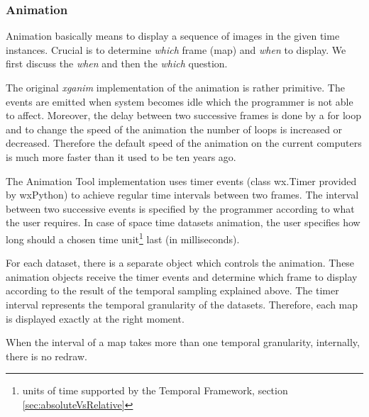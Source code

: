 \documentclass[a4paper,12pt]{book}
\newcommand{\mod}[1]{\textsl{#1}}
\newcommand{\tf}{Temporal Framework\xspace}
\newcommand{\at}{Animation Tool\xspace}
\begin{document}
\begin{table}
\end{table}

\subsubsection{Animation}
Animation basically means to display a sequence of images in the given time instances.
Crucial is to determine \emph{which} frame (map) and \emph{when} to display.
We first discuss the \emph{when}  and then the \emph{which} question.


The original \mod{xganim} implementation of the animation is rather primitive.
The events are emitted when system becomes idle which the programmer is not able to affect.
Moreover, the delay between two successive frames is done by a for loop
and to change the speed of the animation the number of loops is increased or decreased.
Therefore the default speed of the animation on the current computers is much more faster than it used to be ten years ago.

The \at implementation uses timer events (class wx.Timer provided by wxPython) to achieve regular time intervals between two frames.
The interval between two successive events is specified by the programmer according to what the user requires.
In case of space time datasets animation, the user specifies how long
should a chosen time unit\footnote{units of time supported by the \tf, section \ref{sec:absoluteVsRelative}}
last (in milliseconds).

For each dataset, there is a separate object which controls the animation.
These animation objects receive the timer events and determine
which frame to display according to the result of the temporal sampling explained above.
The timer interval represents the temporal granularity of the datasets.
Therefore, each map is displayed exactly at the right moment.

When the interval of a map takes more than one temporal granularity, internally, there is no redraw.
\end{document}
